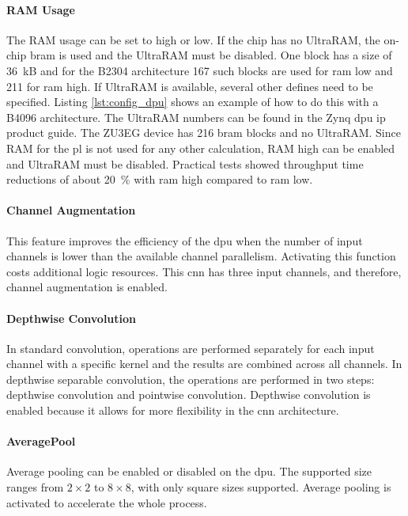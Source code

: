\paragraph{RAM Usage}
The RAM usage can be set to high or low.
If the chip has no UltraRAM, the on-chip \acrshort{bram} is used and the UltraRAM must be disabled.
One block has a size of \SI{36}{kB} and for the B2304 architecture 167 such blocks are used for \acrshort{ram} low and 211 for \acrshort{ram} high.
If UltraRAM is available, several other defines need to be specified.
Listing \ref{lst:config_dpu} shows an example of how to do this with a B4096 architecture.
The UltraRAM numbers can be found in the Zynq \acrshort{dpu} \acrshort{ip} product guide.
The ZU3EG device has 216 \acrfull{bram} blocks and no UltraRAM.
Since RAM for the \acrshort{pl} is not used for any other calculation, RAM high can be enabled and UltraRAM must be disabled.
Practical tests showed throughput time reductions of about \SI{20}{\percent} with \acrshort{ram} high compared to \acrshort{ram} low.

\paragraph{Channel Augmentation}
This feature improves the efficiency of the \acrshort{dpu} when the number of input channels is lower than the available channel parallelism.
Activating this function costs additional logic resources.
This \acrshort{cnn} has three input channels, and therefore, channel augmentation is enabled.

\paragraph{Depthwise Convolution}
In standard convolution, operations are performed separately for each input channel with a specific kernel and the results are combined across all channels.
In depthwise separable convolution, the operations are performed in two steps: depthwise convolution and pointwise convolution.
Depthwise convolution is enabled because it allows for more flexibility in the \acrshort{cnn} architecture.

\paragraph{AveragePool}
Average pooling can be enabled or disabled on the \acrshort{dpu}.
The supported size ranges from $2\times2$ to $8\times8$, with only square sizes supported.
Average pooling is activated to accelerate the whole process.

